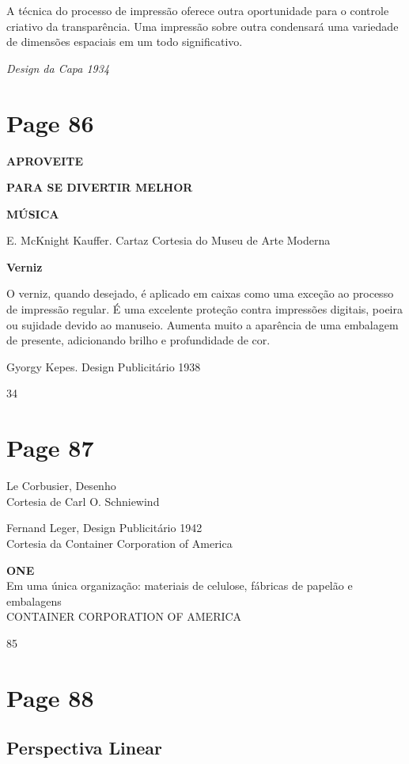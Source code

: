 \documentclass[a4paper]{article}
\begin{document}
A técnica do processo de impressão oferece outra oportunidade para o controle criativo da transparência. Uma impressão sobre outra condensará uma variedade de dimensões espaciais em um todo significativo.\par

\textit{Design da Capa 1934}\par

\newpage
\section*{Page 86}

\textbf{APROVEITE}

\textbf{PARA SE DIVERTIR MELHOR}

\textbf{MÚSICA}

E. McKnight Kauffer. Cartaz
Cortesia do Museu de Arte Moderna

\textbf{Verniz}

O verniz, quando desejado, é aplicado em caixas como uma exceção ao processo de impressão regular. É uma excelente proteção contra impressões digitais, poeira ou sujidade devido ao manuseio. Aumenta muito a aparência de uma embalagem de presente, adicionando brilho e profundidade de cor.

Gyorgy Kepes. Design Publicitário 1938

34

\newpage
\section*{Page 87}

\raggedright
Le Corbusier, Desenho \\
Cortesia de Carl O. Schniewind

Fernand Leger, Design Publicitário 1942 \\
Cortesia da Container Corporation of America

\textbf{\Large ONE} \\
Em uma única organização: materiais de celulose, fábricas de papelão e embalagens \\
CONTAINER CORPORATION OF AMERICA

85

\newpage
\section*{Page 88}

\subsection*{Perspectiva Linear}
\end{document}
